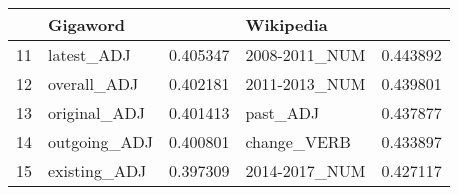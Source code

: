 \begin{tabular}{llrlr}
\toprule
{} &      Gigaword &   &      Wikipedia &   \\
\midrule
11 &    latest\_ADJ &         0.405347 &  2008-2011\_NUM &          0.443892 \\
12 &   overall\_ADJ &         0.402181 &  2011-2013\_NUM &          0.439801 \\
13 &  original\_ADJ &         0.401413 &       past\_ADJ &          0.437877 \\
14 &  outgoing\_ADJ &         0.400801 &    change\_VERB &          0.433897 \\
15 &  existing\_ADJ &         0.397309 &  2014-2017\_NUM &          0.427117 \\
\bottomrule
\end{tabular}
